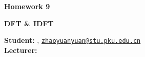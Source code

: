 





\begin{Large}
    \textsf{\textbf{Homework 9}}
    
    \textbf{DFT \& IDFT}
\end{Large}

\vspace{1ex}

\textsf{\textbf{Student:}} , \href{mailto:your.email@hotmail.com}{\texttt{zhaoyuanyuan@stu.pku.edu.cn}}\\
\textsf{\textbf{Lecturer:}} 


\vspace{2ex}

